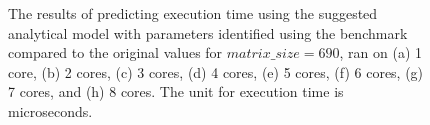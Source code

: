 \begin{figure}[H]
{		\label{fig52:h}}
	\caption{The results of predicting execution time using the suggested analytical model with parameters identified using the benchmark compared to the original values for $matrix\_{size}=690$, ran on (a) 1 core, (b) 2 cores, (c) 3 cores, (d) 4 cores, (e) 5 cores, (f) 6 cores, (g) 7 cores, and (h) 8 cores. The unit for execution time is microseconds.}
	\label{fig52}	
\end{figure}

\begin{figure}[H]
	\centering
	\hfill
\end{figure}
